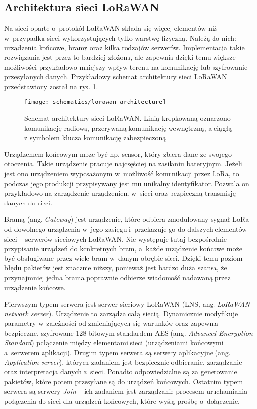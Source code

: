 \FloatBarrier
\subsection{\label{sect:lorawan-architecture}Architektura sieci LoRaWAN} Na sieci oparte o~protokół LoRaWAN składa się
więcej elementów niż w~przypadku sieci wykorzystujących tylko warstwę fizyczną. Należą do nich: urządzenia końcowe,
bramy oraz kilka rodzajów serwerów. Implementacja takie rozwiązania jest przez to bardziej złożona, ale zapewnia dzięki
temu większe możliwości przykładowo mniejszy wpływ terenu na komunikację lub szyfrowanie przesyłanych danych.
Przykładowy schemat architektury sieci LoRaWAN przedstawiony został na rys. \ref{img:lorawan-architecture}.

\begin{figure}[!htbp]
    \centering
    \texttt{[image: schematics/lorawan-architecture]}
    \caption{\label{img:lorawan-architecture}Schemat architektury sieci LoRaWAN. Linią kropkowaną oznaczono komunikację
        radiową, przerywaną komunikację wewnętrzną, a ciągłą z symbolem klucza komunikację zabezpieczoną}
\end{figure}

Urządzeniem końcowym może być np. sensor, który zbiera dane ze swojego otoczenia. Takie urządzenie pracuje najczęściej
na zasilaniu bateryjnym. Jeżeli jest ono urządzeniem wyposażonym w~możliwość komunikacji przez LoRa, to podczas jego
produkcji przypisywany jest mu unikalny identyfikator. Pozwala on przykładowo na zarządzenie urządzeniem w~sieci oraz
bezpieczną transmisję danych do sieci.

Bramą (ang. \textsl{Gateway}) jest urządzenie, które odbiera zmodulowany sygnał LoRa od dowolnego urządzenia w~jego
zasięgu i~przekazuje go do dalszych elementów sieci -- serwerów sieciowych LoRaWAN. Nie występuje tutaj bezpośrednie
przypisanie urządzeń do konkretnych bram, a~każde urządzenie końcowe może być obsługiwane przez wiele bram w~danym
obrębie sieci. Dzięki temu poziom błędu pakietów jest znacznie niższy, ponieważ jest bardzo duża szansa, że przynajmniej
jedna brama poprawnie odbierze wiadomość nadawaną przez urządzenie końcowe.

Pierwszym typem serwera jest serwer sieciowy LoRaWAN (LNS, ang. \textsl{LoRaWAN network server}). Urządzenie to zarządza
całą siecią. Dynamicznie modyfikuje parametry w~zależności od zmieniających się warunków oraz zapewnia bezpieczne,
szyfrowane 128-bitowym standardem AES (ang. \textsl{Advanced Encryption Standard}) połączenie między elementami sieci
(urządzeniami końcowymi a~serwerem aplikacji). Drugim typem serwera są serwery aplikacyjne (ang. \textsl{Application
    server}), których zadaniem jest bezpiecznie odbieranie, zarządzanie oraz interpretacja danych z~sieci. Ponadto
odpowiedzialne są za generowanie pakietów, które potem przesyłane są do urządzeń końcowych. Ostatnim typem serwera są
serwery \textsl{Join} -- ich zadaniem jest zarządzanie procesem uruchamiania połączenia do sieci dla urządzeń końcowych,
które wyślą prośbę o~dołączenie.